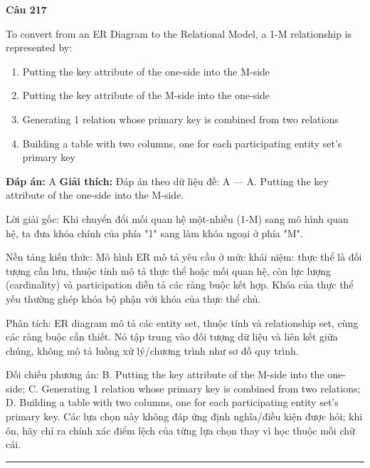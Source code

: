 \documentclass[11pt,a4paper]{article}
\newenvironment{question}[1]{%
  \par\vspace{1em}\noindent\textbf{\large Câu #1}\par\vspace{0.4em}
}{%
  \par\vspace{1em}\hrule\vspace{0.6em}
}
\newenvironment{choices}{%
  \begin{enumerate}[label=\textbf{\Alph*.},leftmargin=2.2em,itemsep=2pt,topsep=3pt]
}{%
  \end{enumerate}
}
\newcommand{\choice}{\item}
\begin{document}
\begin{question}{217}
To convert from an ER Diagram to the Relational Model, a 1-M relationship is represented by:
\begin{choices}
\choice Putting the key attribute of the one-side into the M-side
\choice Putting the key attribute of the M-side into the one-side
\choice Generating 1 relation whose primary key is combined from two relations
\choice Building a table with two columns, one for each participating entity set's primary key
\end{choices}
\textbf{Đáp án:} A
\textbf{Giải thích:} Đáp án theo dữ liệu đề: A — A. Putting the key attribute of the one-side into the M-side.

Lời giải gốc: Khi chuyển đổi mối quan hệ một-nhiều (1-M) sang mô hình quan hệ, ta đưa khóa chính của phía "1" sang làm khóa ngoại ở phía "M".

Nền tảng kiến thức: Mô hình ER mô tả yêu cầu ở mức khái niệm: thực thể là đối tượng cần lưu, thuộc tính mô tả thực thể hoặc mối quan hệ, còn lực lượng (cardinality) và participation diễn tả các ràng buộc kết hợp. Khóa của thực thể yếu thường ghép khóa bộ phận với khóa của thực thể chủ.

Phân tích: ER diagram mô tả các entity set, thuộc tính và relationship set, cùng các ràng buộc cần thiết. Nó tập trung vào đối tượng dữ liệu và liên kết giữa chúng, không mô tả luồng xử lý/chương trình như sơ đồ quy trình.

Đối chiếu phương án: B. Putting the key attribute of the M-side into the one-side; C. Generating 1 relation whose primary key is combined from two relations; D. Building a table with two columns, one for each participating entity set's primary key. Các lựa chọn này không đáp ứng định nghĩa/điều kiện được hỏi; khi ôn, hãy chỉ ra chính xác điểm lệch của từng lựa chọn thay vì học thuộc mỗi chữ cái.
\end{question}
\end{document}
